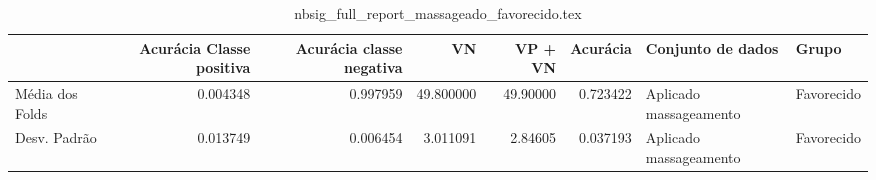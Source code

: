 \begin{table}
\centering
\caption{nbsig_full_report_massageado_favorecido.tex}
\label{nbsig_full_report_massageado_favorecido.tex}
\begin{tabular}{lrrrrrll}
\toprule
{} &  Acurácia Classe positiva &  Acurácia classe negativa &        VN  &  VP + VN  &  Acurácia &       Conjunto de dados &       Grupo \\
\midrule
Média dos Folds &                  0.004348 &                  0.997959 &  49.800000 &  49.90000 &  0.723422 &  Aplicado massageamento &  Favorecido \\
Desv. Padrão    &                  0.013749 &                  0.006454 &   3.011091 &   2.84605 &  0.037193 &  Aplicado massageamento &  Favorecido \\
\bottomrule
\end{tabular}
\end{table}
